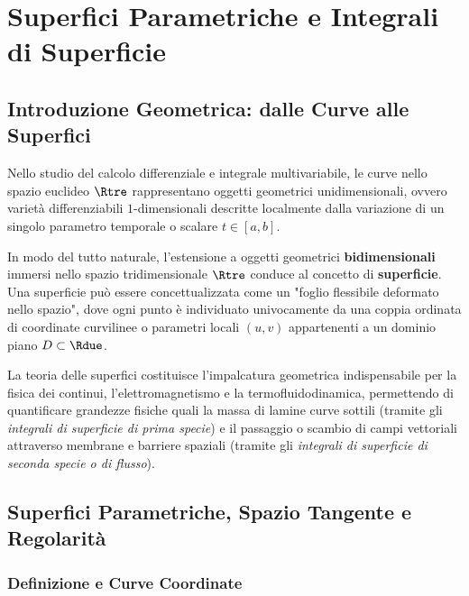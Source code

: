 
\chapter{Superfici Parametriche e Integrali di Superficie}
\label{chap:superfici_e_integrali_di_superficie}

\section{Introduzione Geometrica: dalle Curve alle Superfici}

Nello studio del calcolo differenziale e integrale multivariabile, le curve nello spazio euclideo $\Rtre$ rappresentano oggetti geometrici unidimensionali, ovvero varietà differenziabili $1$-dimensionali descritte localmente dalla variazione di un singolo parametro temporale o scalare $t \in [a,b]$.

In modo del tutto naturale, l'estensione a oggetti geometrici \textbf{bidimensionali} immersi nello spazio tridimensionale $\Rtre$ conduce al concetto di \textbf{superficie}. Una superficie può essere concettualizzata come un "foglio flessibile deformato nello spazio", dove ogni punto è individuato univocamente da una coppia ordinata di coordinate curvilinee o parametri locali $(u,v)$ appartenenti a un dominio piano $D \subset \Rdue$.

La teoria delle superfici costituisce l'impalcatura geometrica indispensabile per la fisica dei continui, l'elettromagnetismo e la termofluidodinamica, permettendo di quantificare grandezze fisiche quali la massa di lamine curve sottili (tramite gli \textit{integrali di superficie di prima specie}) e il passaggio o scambio di campi vettoriali attraverso membrane e barriere spaziali (tramite gli \textit{integrali di superficie di seconda specie o di flusso}).

\section{Superfici Parametriche, Spazio Tangente e Regolarità}

\subsection{Definizione e Curve Coordinate}

